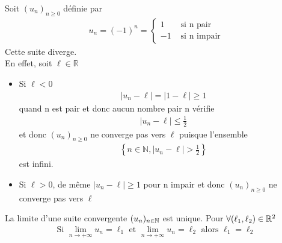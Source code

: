 \begin{exemple}
    Soit $(u_n)_{n \geqslant 0}$ définie par 
    \begin{align*}
        u_n = (-1)^n =
        \begin{cases}
        1 &\text{ si n pair} \\
        -1 &\text{ si n impair}
        \end{cases}
    \end{align*}
    Cette suite diverge. \\
    En effet, soit $\ell \in \mathbb{R}$
    \begin{itemize}
        \item Si $\ell < 0$
        \begin{align*}
            |u_n - \ell| = |1 - \ell| \geqslant 1
        \end{align*}
        quand n est pair et donc aucun nombre pair n vérifie
        \begin{align*}
            |u_n - \ell| \leqslant \frac{1}{2}
        \end{align*}
        et donc $(u_n)_{n \geqslant 0}$ ne converge pas vers $\ell$
        puisque l'ensemble  
        \begin{align*}
            \left\{n \in \mathbb{N}, |u_n - \ell| > \frac{1}{2}\right\}
        \end{align*}
        est infini.
        
        \item Si $\ell > 0$, de même $|u_n - \ell| \geqslant 1$ pour n impair et donc $(u_n)_{n \geqslant 0}$ ne converge pas vers $\ell$
    \end{itemize}
\end{exemple}

\begin{graybox}
    \begin{theoreme}
    La limite d'une suite convergente $(u_n)_{n \in \mathbb{N}}$ est unique. Pour $\forall (\ell_1, \ell_2) \in \mathbb{R}^2$
    \begin{align*}
        \text{Si } \lim_{n \to +\infty} u_n = \ell_1 \text{ et }\lim_{n \to +\infty} u_n = \ell_2 \text{ alors } \ell_1 = \ell_2
    \end{align*}
\end{theoreme}
\end{graybox}


